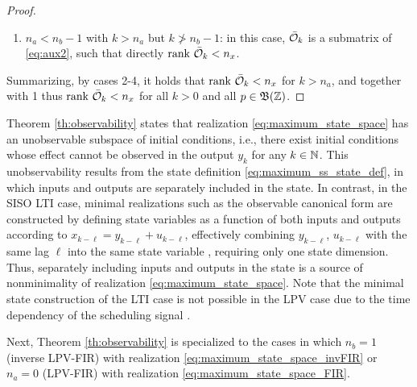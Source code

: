 \begin{proof}
\begin{enumerate}[leftmargin=*]
        \item $n_a < n_b -1$ with $k>n_a$ but $k \ngtr n_b-1$: in this case, $\bar{\mathcal{O}}_k$ is a submatrix of \eqref{eq:aux2}, such that directly  $\textrm{rank}\ \bar{\mathcal{O}}_k < n_x$.
    \end{enumerate}
    Summarizing, by cases 2-4, it holds that $\textrm{rank}\ \bar{\mathcal{O}}_k < n_x$ for $k > n_a$, and together with 1 thus $\textrm{rank}\ \bar{\mathcal{O}}_k < n_x$ for all $k>0$ and all $p\in\mathfrak{B}(\mathbb{Z})$.
\end{proof}

Theorem \ref{th:observability} states that realization \eqref{eq:maximum_state_space} has an unobservable subspace of initial conditions, i.e., there exist initial conditions whose effect cannot be observed in the output $y_k$ for any $k\in\mathbb{N}$. This unobservability results from the state definition \eqref{eq:maximum_ss_state_def}, in which inputs and outputs are separately included in the state. In contrast, in the SISO LTI case, minimal realizations such as the observable canonical form are constructed by defining state variables as a function of both inputs and outputs according to $x_{k-\ell} = y_{k-\ell} + u_{k-\ell}$, effectively combining $y_{k-\ell}$, $u_{k-\ell}$ with the same lag $\ell$ into the same state variable \cite[section 2.3.3]{Goodwin1984}, requiring only one state dimension. Thus, separately including inputs and outputs in the state is a source of nonminimality of realization \eqref{eq:maximum_state_space}. Note that the minimal state construction of the LTI case is not possible in the LPV case due to the time dependency of the scheduling signal \cite{Toth2007}. 

Next, Theorem \ref{th:observability} is specialized to the cases in which $n_b=1$ (inverse LPV-FIR) with realization \eqref{eq:maximum_state_space_invFIR} or $n_a=0$ (LPV-FIR) with realization \eqref{eq:maximum_state_space_FIR}.

